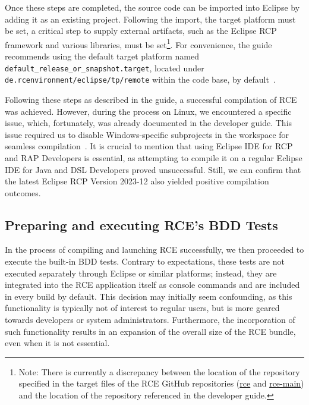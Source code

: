 Once these steps are completed, the source code can be imported into Eclipse by adding it as an existing project. Following the import, the target platform must be set, a critical step to supply external artifacts, such as the Eclipse RCP framework and various libraries, must be set\footnote{Note: There is currently a discrepancy between the location of the repository specified in the target files of the RCE GitHub repositories (\href{https://github.com/rcenvironment/rce/blob/master/de.rcenvironment/eclipse/tp/remote/default_release_or_snapshot.target}{rce} and \href{https://github.com/rcenvironment/rce-main/blob/main/de.rcenvironment/eclipse/tp/remote/default_release_or_snapshot.target}{rce-main}) and the location of the repository referenced in the developer guide.}. For convenience, the guide recommends using the default target platform named \texttt{default\_release\_or\_snapshot.target}, located under \texttt{de.rcenvironment/eclipse/tp/remote} within the code base, by default~\cite{rceDevGuide10x}.

Following these steps as described in the guide, a successful compilation of \ac{RCE} was achieved. However, during the process on Linux, we encountered a specific issue, which, fortunately, was already documented in the developer guide. This issue required us to disable Windows-specific subprojects in the workspace for seamless compilation~\cite{rceDevGuide10x}. It is crucial to mention that using Eclipse IDE for RCP and RAP Developers is essential, as attempting to compile it on a regular Eclipse IDE for Java and DSL Developers proved unsuccessful. Still, we can confirm that the latest Eclipse RCP Version 2023-12 also yielded positive compilation outcomes.

\subsection{Preparing and executing \ac{RCE}'s BDD Tests}
\label{subsec:PreparingRCETests}
In the process of compiling and launching \ac{RCE} successfully, we then proceeded to execute the built-in BDD tests. Contrary to expectations, these tests are not executed separately through Eclipse or similar platforms; instead, they are integrated into the \ac{RCE} application itself as console commands and are included in every build by default. This decision may initially seem confounding, as this functionality is typically not of interest to regular users, but is more geared towards developers or system administrators. Furthermore, the incorporation of such functionality results in an expansion of the overall size of the \ac{RCE} bundle, even when it is not essential. 

